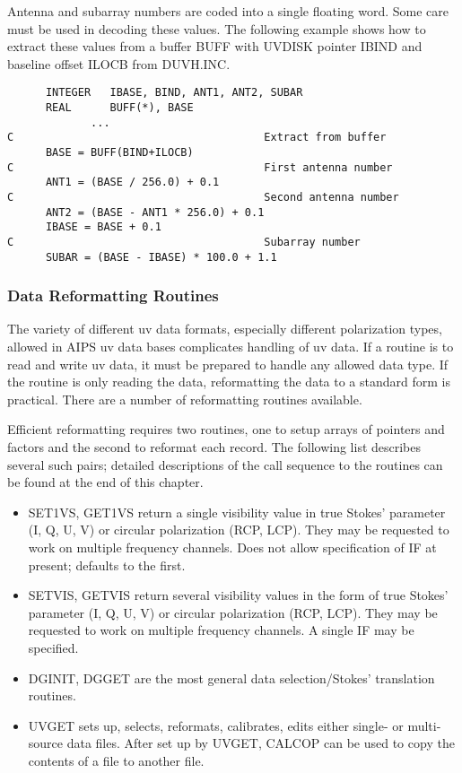    Antenna and subarray numbers are coded into a single floating word.
Some care must be used in decoding these values.  The following
example shows how to extract these values from a buffer BUFF with
UVDISK pointer IBIND and baseline offset ILOCB from DUVH.INC.
\begin{verbatim}
      INTEGER   IBASE, BIND, ANT1, ANT2, SUBAR
      REAL      BUFF(*), BASE
             ...
C                                       Extract from buffer
      BASE = BUFF(BIND+ILOCB)
C                                       First antenna number
      ANT1 = (BASE / 256.0) + 0.1
C                                       Second antenna number
      ANT2 = (BASE - ANT1 * 256.0) + 0.1
      IBASE = BASE + 0.1
C                                       Subarray number
      SUBAR = (BASE - IBASE) * 100.0 + 1.1
\end{verbatim}

\subsubsection{Data Reformatting Routines}
The variety of different uv data formats, especially different
polarization types, allowed in AIPS uv data bases complicates handling
of uv data.  If a routine is to read and write uv data, it must be
prepared to handle any allowed data type.  If the routine is only
reading the data, reformatting the data to a standard form is
practical.  There are a  number of reformatting routines available.

Efficient reformatting requires two routines, one to setup arrays of
pointers and factors and the second to reformat each record.  The
following list describes several such pairs; detailed descriptions of
the call sequence to the routines can be found at the end of this
chapter.
\begin{itemize} %
\item SET1VS, GET1VS return a single visibility value in true Stokes'
parameter (I, Q, U, V) or circular polarization (RCP, LCP).  They may
be requested to work on multiple frequency channels.  Does not allow
specification of IF at present; defaults to the first.
\item SETVIS, GETVIS return several visibility values in the form of true
Stokes' parameter (I, Q, U, V) or circular polarization (RCP, LCP).
They may be requested to work on multiple frequency channels. A single
IF may be specified.
\item DGINIT, DGGET are the most general data selection/Stokes'
translation routines.
\item UVGET sets up, selects, reformats, calibrates, edits either single- or
multi-source data files.  After set up by UVGET, CALCOP can be used to
copy the contents of a file to another file.

\end{itemize} %
